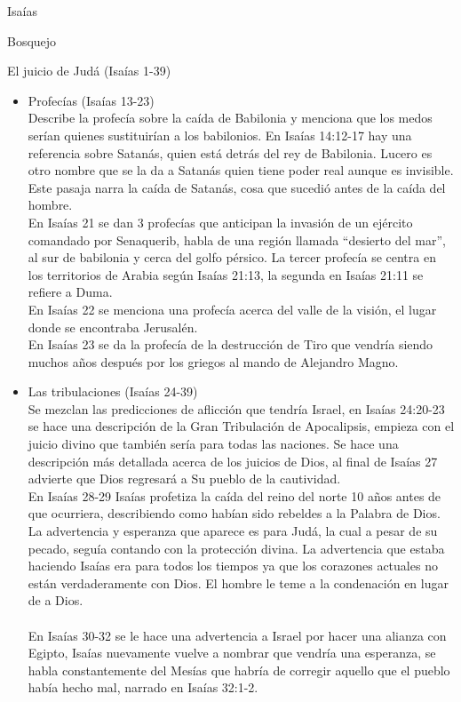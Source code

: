 \begin{section}{Isaías}
\begin{subsection}{Bosquejo}
\begin{subsubsection}{El juicio de Judá (Isaías 1-39)}
\begin{itemize}
\item Profecías (Isaías 13-23)\\
	Describe la profecía sobre la caída de Babilonia y menciona que los medos serían quienes sustituirían a los babilonios. En Isaías 14:12-17 hay una referencia sobre Satanás, quien está detrás del rey de Babilonia. 
	\newpage
	Lucero es otro nombre que se la da a Satanás quien tiene poder real aunque es invisible. Este pasaja narra la caída de Satanás, cosa que sucedió antes de la caída del hombre.\\
	En Isaías 21 se dan 3 profecías que anticipan la invasión de un ejército comandado por Senaquerib, habla de una región llamada ``desierto del mar'', al sur de babilonia y cerca del golfo pérsico. La tercer profecía se centra en los territorios de Arabia según Isaías 21:13, la segunda en Isaías 21:11 se refiere a Duma.\\
	En Isaías 22 se menciona una profecía acerca del valle de la visión, el lugar donde se encontraba Jerusalén.\\
En Isaías 23 se da la profecía de la destrucción de Tiro que vendría siendo muchos años después por los griegos al mando de Alejandro Magno.
\item Las tribulaciones (Isaías 24-39)\\
	Se mezclan las predicciones de aflicción que tendría Israel, en Isaías 24:20-23 se hace una descripción de la Gran Tribulación de Apocalipsis, empieza con el juicio divino que también sería para todas las naciones. Se hace una descripción más detallada acerca de los juicios de Dios, al final de Isaías 27 advierte que Dios regresará a Su pueblo de la cautividad.\\
	En Isaías 28-29 Isaías profetiza la caída del reino del norte 10 años antes de que ocurriera, describiendo como habían sido rebeldes a la Palabra de Dios. La advertencia y esperanza que aparece es para Judá, la cual a pesar de su pecado, seguía contando con la protección divina. La advertencia que estaba haciendo Isaías era para todos los tiempos ya que los corazones actuales no están verdaderamente con Dios. El hombre le teme a la condenación en lugar de a Dios.\\
	\\
	En Isaías 30-32 se le hace una advertencia a Israel por hacer una alianza con Egipto, Isaías nuevamente vuelve a nombrar que vendría una esperanza, se habla constantemente del Mesías que habría de corregir aquello que el pueblo había hecho mal, narrado en Isaías 32:1-2.\\

\end{itemize}
\end{subsubsection}
\end{subsection}
\end{section}
